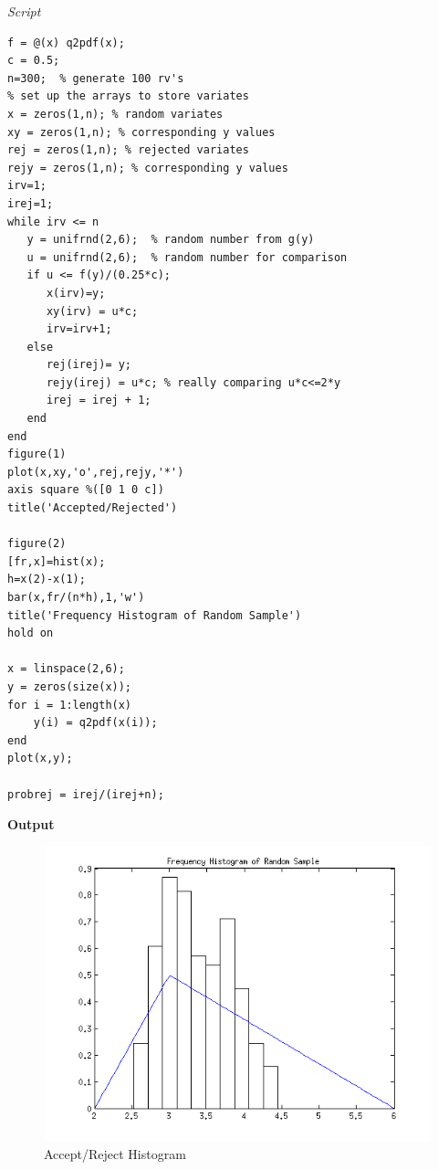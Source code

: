 \documentclass[12pt,a4paper]{article}
\begin{document}
\textit{Script}
\begin{verbatim}
f = @(x) q2pdf(x);
c = 0.5;
n=300;  % generate 100 rv's
% set up the arrays to store variates
x = zeros(1,n); % random variates
xy = zeros(1,n); % corresponding y values
rej = zeros(1,n); % rejected variates
rejy = zeros(1,n); % corresponding y values
irv=1;			
irej=1;
while irv <= n
   y = unifrnd(2,6);  % random number from g(y)
   u = unifrnd(2,6);  % random number for comparison
   if u <= f(y)/(0.25*c);
      x(irv)=y;
      xy(irv) = u*c;
      irv=irv+1;
   else
      rej(irej)= y;
      rejy(irej) = u*c; % really comparing u*c<=2*y
      irej = irej + 1;
   end
end
figure(1)
plot(x,xy,'o',rej,rejy,'*')
axis square %([0 1 0 c])
title('Accepted/Rejected')

figure(2)
[fr,x]=hist(x);
h=x(2)-x(1);
bar(x,fr/(n*h),1,'w')
title('Frequency Histogram of Random Sample')
hold on

x = linspace(2,6);
y = zeros(size(x));
for i = 1:length(x)
    y(i) = q2pdf(x(i));
end
plot(x,y);

probrej = irej/(irej+n);
\end{verbatim}

\textbf{Output}\\

\begin{figure}[ht!]
\begin{center}
\includegraphics[scale=.9]{q2_hist.png}
\caption{Accept/Reject Histogram}
\label{q2 fig1}
\end{center}
\end{figure}
\FloatBarrier
\end{document}
